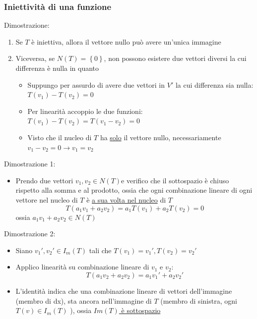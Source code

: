 \documentclass[12pt,a4paper,oneside]{article}
\begin{document}
\subsubsection*{Iniettività di una funzione}
Dimostrazione:
\begin{enumerate}
	\item Se $ T $ è iniettiva, allora il vettore nullo può avere un'unica immagine
	\item Viceversa, se $ N\left( T \right) = \left\{ 0 \right\}  $, non possono esistere due vettori diversi la cui differenza è nulla in quanto
	      \begin{itemize}
		      \item Suppungo per assurdo di avere due vettori in $ V' $ la cui differenza sia nulla: $ T\left( v_1 \right) -T\left( v_2 \right) =0 $
		      \item Per linearità accoppio le due funzioni:  $ T\left( v_1 \right) -T\left( v_2 \right) = T\left( v_1-v_2 \right) =0 $
		      \item Visto che il nucleo di $ T $ ha \underline{solo} il vettore nullo, necessariamente $ v_1-v_2=0 \rightarrow v_1=v_2 $
	      \end{itemize}
\end{enumerate}

Dimostrazione 1:
\begin{itemize}
	\item Prendo due vettori $ v_1,v_2 \in N\left( T \right)  $e verifico che il sottospazio è chiuso rispetto alla somma e al prodotto, ossia che ogni combinazione lineare di ogni vettore nel nucleo di $ T $ è \underline{a sua volta nel nucleo} di $ T $
	      \[
		      T\left( a_1v_1 + a_2v_2 \right) =a_1T\left( v_1 \right) + a_2T\left( v_2 \right) =0
	      \]
	      ossia $  a_1v_1 + a_2v_2 \in  N\left( T \right) $
\end{itemize}
Dimostrazione 2:
\begin{itemize}
	\item Siano $ v_1', v_2' \in  I_m \left( T \right)  $ tali che $  T\left( v_1 \right) = v_1', T\left( v_2 \right) = v_2' $
	\item Applico linearità su combinazione lineare di $ v_1 $ e $ v_2 $:
	      \[
		      T\left( a_1 v_2 + a_2 v_2 \right) = a_1v_1' + a_2v_2'
	      \]
	\item L'identità indica che una combinazione lineare di vettori dell'immagine (membro di dx), sta ancora nell'immagine di $ T $ (membro di sinistra, ogni $ T\left( v \right)  \in I_m\left( T \right) $ ), ossia \underline{ $ Im \left( T \right)  $ è sottospazio}
\end{itemize}
\end{document}
